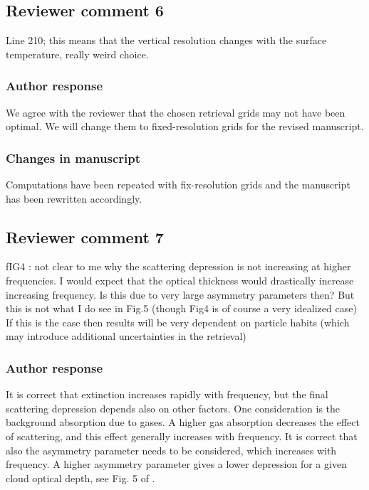 \subsection*{Reviewer comment 6}
Line 210; this means that the vertical resolution changes with the surface temperature, really weird choice.

\subsubsection*{Author response}

We agree with the reviewer that the chosen retrieval grids may not have been optimal.
We will change them to fixed-resolution grids for the revised manuscript.

\subsubsection*{Changes in manuscript}
Computations have been repeated with fix-resolution grids and the manuscript has been rewritten
accordingly.

\subsection*{Reviewer comment 7}

fIG4 : not clear to me why the scattering depression is not increasing at
higher frequencies. I would expect that the optical thickness would drastically
increase increasing frequency. Is this due to very large asymmetry parameters
then? But this is not what I do see in Fig.5 (though Fig4 is of course a very
idealized case) If this is the case then results will be very dependent on
particle habits (which may introduce additional uncertainties in the retrieval)

\subsubsection*{Author response}

It is correct that extinction increases rapidly with frequency, but the final
scattering depression depends also on other factors. One consideration is the
background absorption due to gases. A higher gas absorption decreases the effect
of scattering, and this effect generally increases with frequency. It is correct
that also the asymmetry parameter needs to be considered, which increases with
frequency. A higher asymmetry parameter gives a lower depression for a given
cloud optical depth, see Fig. 5 of \citet{eriksson15}.

